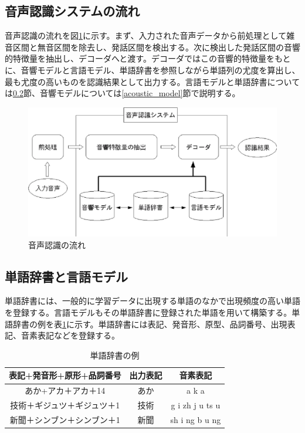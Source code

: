 \subsection{音声認識システムの流れ}
音声認識の流れを図\ref{fig:flow_sp}に示す。まず、入力された音声データから前処理として雑音区間と無音区間を除去し、発話区間を検出する。次に検出した発話区間の音響的特徴量を抽出し、デコーダへと渡す。デコーダではこの音響的特徴量をもとに、音響モデルと言語モデル、単語辞書を参照しながら単語列の尤度を算出し、最も尤度の高いものを認識結果として出力する。言語モデルと単語辞書については\ref{language_model}節、音響モデルについては\ref{acoustic_model}節で説明する。

\begin{figure}[H]
  \begin{center}
    \includegraphics{../../image/flow_sp.eps}
  \end{center}
  \caption{音声認識の流れ}
  \label{fig:flow_sp}
\end{figure}

\subsection{単語辞書と言語モデル}
\label{language_model}

\par
単語辞書には、一般的に学習データに出現する単語のなかで出現頻度の高い単語を登録する\cite{sp_recognition_shikano}。言語モデルもその単語辞書に登録された単語を用いて構築する。単語辞書の例を表\ref{table:tango}に示す。単語辞書には表記、発音形、原型、品詞番号、出現表記、音素表記などを登録する。\par

\begin{table}[H]
  \begin{center}
    \caption{単語辞書の例}
    \begin{tabular}{|c||c|c|} \hline
      表記+発音形+原形+品詞番号 & 出力表記 & 音素表記 \\ \hline
      あか+アカ＋アカ＋14 & あか & a k a \\ \hline
      技術＋ギジュツ＋ギジュツ＋1 & 技術 & g i zh j u ts u \\ \hline
      新聞＋シンブン＋シンブン＋1 & 新聞 & sh i ng b u ng \\ \hline
    \end{tabular}
    \label{table:tango}
  \end{center}
\end{table}

